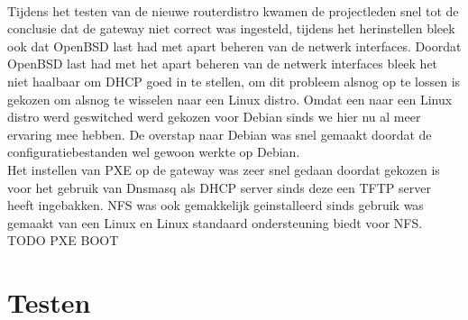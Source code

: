 \documentclass[12pt]{article}
\begin{document}
\\Tijdens het testen van de nieuwe routerdistro kwamen de projectleden snel tot de conclusie dat de gateway niet correct was ingesteld, tijdens het herinstellen bleek ook dat OpenBSD last had met apart beheren van de netwerk interfaces. Doordat OpenBSD last had met het apart beheren van de netwerk interfaces bleek het niet haalbaar om DHCP goed in te stellen, om dit probleem alsnog op te lossen is gekozen om alsnog te wisselen naar een Linux distro. Omdat een naar een Linux distro werd geswitched werd gekozen voor Debian sinds we hier nu al meer ervaring mee hebben. De overstap naar Debian was snel gemaakt doordat de configuratiebestanden wel gewoon werkte op Debian.
\\Het instellen van PXE op de gateway was zeer snel gedaan doordat gekozen is voor het gebruik van Dnsmasq als DHCP server sinds deze een TFTP server heeft ingebakken. NFS was ook gemakkelijk geinstalleerd sinds gebruik was gemaakt van een Linux en Linux standaard ondersteuning biedt voor NFS.
\\TODO PXE BOOT
\section{Testen}
\end{document}
